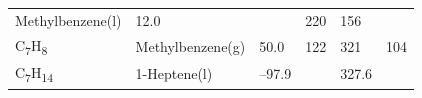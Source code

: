 \documentclass[
]{book}
\theoremstyle{definition}
\theoremstyle{definition}
\theoremstyle{definition}
\theoremstyle{remark}
\begin{document}
\begin{longtable}[]{@{}llllll@{}}
\begin{minipage}[t]{0.17\columnwidth}
Methylbenzene(l)\strut
\end{minipage} & \begin{minipage}[t]{0.15\columnwidth}\raggedright
12.0\strut
\end{minipage} & \begin{minipage}[t]{0.15\columnwidth}\raggedright
\strut
\end{minipage} & \begin{minipage}[t]{0.14\columnwidth}\raggedright
220\strut
\end{minipage} & \begin{minipage}[t]{0.14\columnwidth}\raggedright
156\strut
\end{minipage}\tabularnewline
\begin{minipage}[t]{0.07\columnwidth}\raggedright
C\textsubscript{7}H\textsubscript{8}\strut
\end{minipage} & \begin{minipage}[t]{0.17\columnwidth}\raggedright
Methylbenzene(g)\strut
\end{minipage} & \begin{minipage}[t]{0.15\columnwidth}\raggedright
50.0\strut
\end{minipage} & \begin{minipage}[t]{0.15\columnwidth}\raggedright
122\strut
\end{minipage} & \begin{minipage}[t]{0.14\columnwidth}\raggedright
321\strut
\end{minipage} & \begin{minipage}[t]{0.14\columnwidth}\raggedright
104\strut
\end{minipage}\tabularnewline
\begin{minipage}[t]{0.07\columnwidth}\raggedright
C\textsubscript{7}H\textsubscript{14}\strut
\end{minipage} & \begin{minipage}[t]{0.17\columnwidth}\raggedright
1-Heptene(l)\strut
\end{minipage} & \begin{minipage}[t]{0.15\columnwidth}\raggedright
--97.9\strut
\end{minipage} & \begin{minipage}[t]{0.15\columnwidth}\raggedright
\strut
\end{minipage} & \begin{minipage}[t]{0.14\columnwidth}\raggedright
327.6\strut
\end{minipage} & \begin{minipage}[t]{0.14\columnwidth}\raggedright

\end{minipage}
\end{longtable}
\end{document}
